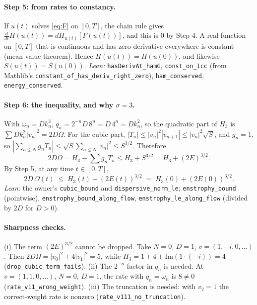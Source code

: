 \documentclass[11pt]{article}
\newcommand{\leanst}[1]{}
\theoremstyle{remark}
\newcommand{\lean}[1]{\texttt{#1}}
\begin{document}
\paragraph{Step 5: from rates to constancy.} If $u(t)$ solves \eqref{eq:F} on $[0,T]$, the chain rule gives
$\frac{d}{dt}H(u(t))=dH_{u(t)}[F(u(t))]$, and this is $0$ by Step 4. A real function on $[0,T]$ that is continuous and
has zero derivative everywhere is constant (mean value theorem). Hence $H(u(t))=H(u(0))$, and likewise $S(u(t))=S(u(0))$.
\emph{Lean:} \lean{hasDerivAt\_hamG}, \lean{const\_on\_Icc} (from Mathlib's \lean{constant\_of\_has\_deriv\_right\_zero}),
\lean{ham\_conserved}, \lean{energy\_conserved}.
\leanst{hasDerivAt_hamG}\leanst{const_on_Icc}\leanst{ham_conserved}\leanst{energy_conserved}

\paragraph{Step 6: the inequality, and why $\sigma=3$.} With $\omega_n=Dk_n^3$, $q_n=2^{-n}D\,8^n=D\,4^n=Dk_n^2$, so the
quadratic part of $H_3$ is $\sum Dk_n^2|v_n|^2=2D\Omega$. For the cubic part, $|T_n|\le|v_n|^2|v_{n+1}|\le|v_n|^2\sqrt S$, and $g_n=1$,
so $|\sum_{n\le N}g_nT_n|\le\sqrt S\sum_{n\le N}|v_n|^2\le S^{3/2}$. Therefore
\[
2D\Omega = H_3-\textstyle\sum g_nT_n\le H_3+S^{3/2}=H_3+(2E)^{3/2}.
\]
By Step 5, at any time $t\in[0,T]$,
\begin{equation}\label{eq:main}
2D\,\Omega(t)\;\le\;H_3(t)+(2E(t))^{3/2}\;=\;H_3(0)+(2E(0))^{3/2}.
\end{equation}
\emph{Lean:} the owner's \lean{cubic\_bound} and \lean{dispersive\_norm\_le}; \lean{enstrophy\_bound} (pointwise),
\lean{enstrophy\_bound\_along\_flow}, \lean{enstrophy\_le\_along\_flow} (divided by $2D$ for $D>0$).
\leanst{cubic_bound}\leanst{dispersive_norm_le}\leanst{enstrophy_bound}\leanst{enstrophy_bound_along_flow}\leanst{enstrophy_le_along_flow}

\paragraph{Sharpness checks.} (i) The term $(2E)^{3/2}$ cannot be dropped. Take $N=0$, $D=1$, $v=(1,-i,0,\dots)$. Then
$2D\Omega=|v_0|^2+4|v_1|^2=5$, while $H_3=1+4+\mathrm{Im}(1\cdot(-i))=4$ (\lean{drop\_cubic\_term\_fails}). (ii) The
$2^{-n}$ factor in $q_n$ is needed. At $v=(1,1,0,\dots)$, $N=0$, $D=1$, the rate with $q_n=\omega_n$ is $8\neq0$
(\lean{rate\_v11\_wrong\_weight}). (iii) The truncation is needed: with $v_2=1$ the correct-weight rate is nonzero
(\lean{rate\_v111\_no\_truncation}).
\leanst{drop_cubic_term_fails}\leanst{rate_v11_wrong_weight}\leanst{rate_v111_no_truncation}
\end{document}
